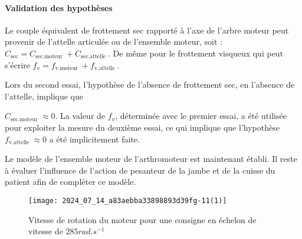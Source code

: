 

\paragraph*{Validation des hypothèses}
Le couple équivalent de frottement sec rapporté à l'axe de l'arbre moteur peut provenir de l'attelle articulée ou de l'ensemble moteur, soit : $C_{\mathrm{sec}}=C_{\text {sec.moteur }}+C_{\text {sec.attelle }}$. De même pour le frottement visqueux qui peut s'écrire $f_{v}=f_{\text {v.moteur }}+f_{\text {v.attelle }}$.

Lors du second essai, l'hypothèse de l'absence de frottement sec, en l'absence de l'attelle, implique que

$C_{\text {sec.moteur }} \approx 0$. La valeur de $f_{v}$, déterminée avec le premier essai, a été utilisée pour exploiter la mesure du deuxième essai, ce qui implique que l'hypothèse $f_{\text {v.attelle }} \approx 0$ a été implicitement faite.


Le modèle de l'ensemble moteur de l'arthromoteur est maintenant établi. Il reste à évaluer l'influence de l'action de pesanteur de la jambe et de la cuisse du patient afin de compléter ce modèle.

\begin{figure}[!h]\centering
\texttt{[image: 2024\_07\_14\_a83aebba33898893d39fg-11(1)]}

\caption{\label{fig:ccs_mp_2024:fig:17}Vitesse de rotation du moteur pour une consigne en échelon de vitesse de $285 \si{rad.s^{-1}}$}
\end{figure}


